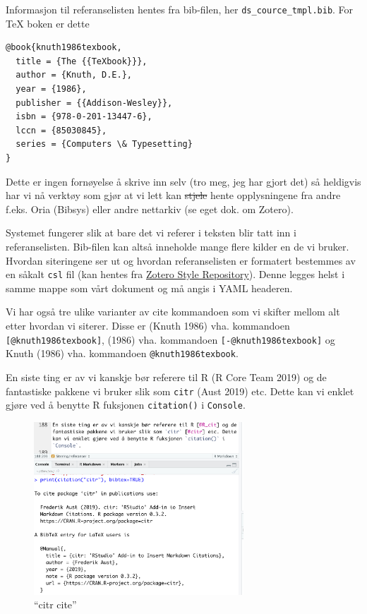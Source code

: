 \documentclass[
]{article}
\begin{document}
Informasjon til referanselisten hentes fra bib-filen, her
\texttt{ds\_cource\_tmpl.bib}. For TeX boken er dette

\begin{verbatim}
@book{knuth1986texbook,
  title = {The {{TeXbook}}},
  author = {Knuth, D.E.},
  year = {1986},
  publisher = {{Addison-Wesley}},
  isbn = {978-0-201-13447-6},
  lccn = {85030845},
  series = {Computers \& Typesetting}
}
\end{verbatim}

Dette er ingen fornøyelse å skrive inn selv (tro meg, jeg har gjort det)
så heldigvis har vi nå verktøy som gjør at vi lett kan \sout{stjele}
hente opplysningene fra andre f.eks. Oria (Bibsys) eller andre nettarkiv
(se eget dok. om Zotero).

Systemet fungerer slik at bare det vi referer i teksten blir tatt inn i
referanselisten. Bib-filen kan altså inneholde mange flere kilder en de
vi bruker. Hvordan siteringene ser ut og hvordan referanselisten er
formatert bestemmes av en såkalt \texttt{csl} fil (kan hentes fra
\href{https://www.zotero.org/styles}{Zotero Style Repository}). Denne
legges helst i samme mappe som vårt dokument og må angis i YAML
headeren.

Vi har også tre ulike varianter av cite kommandoen som vi skifter mellom
alt etter hvordan vi siterer. Disse er (Knuth 1986) vha. kommandoen
\texttt{{[}@knuth1986texbook{]}}, (1986) vha. kommandoen
\texttt{{[}-@knuth1986texbook{]}} og Knuth (1986) vha. kommandoen
\texttt{@knuth1986texbook}.

En siste ting er av vi kanskje bør referere til R (R Core Team 2019) og
de fantastiske pakkene vi bruker slik som \texttt{citr} (Aust 2019) etc.
Dette kan vi enklet gjøre ved å benytte R fuksjonen \texttt{citation()}
i \texttt{Console}.

\begin{figure}
\centering
\includegraphics[width=0.7\textwidth,height=\textheight]{cit_citr.png}
\caption{``citr cite''}
\end{figure}
\end{document}
